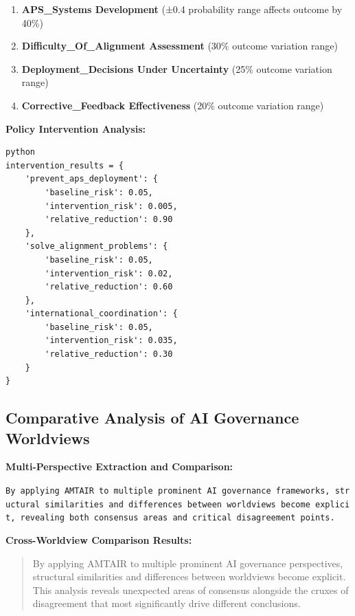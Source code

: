 \documentclass[
  11pt,
  letterpaper,
]{book}
\providecommand{\tightlist}{%
  \setlength{\itemsep}{0pt}\setlength{\parskip}{0pt}}
\begin{document}
\begin{enumerate}
\def\labelenumi{\arabic{enumi}.}
\tightlist
\item
  \textbf{APS\_Systems Development} (±0.4 probability range affects
  outcome by 40\%)
\item
  \textbf{Difficulty\_Of\_Alignment Assessment} (30\% outcome variation
  range)
\item
  \textbf{Deployment\_Decisions Under Uncertainty} (25\% outcome
  variation range)
\item
  \textbf{Corrective\_Feedback Effectiveness} (20\% outcome variation
  range)
\end{enumerate}

\textbf{Policy Intervention Analysis:}

\begin{verbatim}
python
intervention_results = {
    'prevent_aps_deployment': {
        'baseline_risk': 0.05,
        'intervention_risk': 0.005,
        'relative_reduction': 0.90
    },
    'solve_alignment_problems': {
        'baseline_risk': 0.05,  
        'intervention_risk': 0.02,
        'relative_reduction': 0.60
    },
    'international_coordination': {
        'baseline_risk': 0.05,
        'intervention_risk': 0.035,  
        'relative_reduction': 0.30
    }
}
\end{verbatim}

\subsection{Comparative Analysis of AI Governance
Worldviews}\label{sec-comparative-analysis}

\textbf{Multi-Perspective Extraction and Comparison:}

\texttt{By\ applying\ AMTAIR\ to\ multiple\ prominent\ AI\ governance\ frameworks,\ structural\ similarities\ and\ differences\ between\ worldviews\ become\ explicit,\ revealing\ both\ consensus\ areas\ and\ critical\ disagreement\ points.}

\textbf{Cross-Worldview Comparison Results:}

\begin{quote}
By applying AMTAIR to multiple prominent AI governance perspectives,
structural similarities and differences between worldviews become
explicit. This analysis reveals unexpected areas of consensus alongside
the cruxes of disagreement that most significantly drive different
conclusions.
\end{quote}
\end{document}
